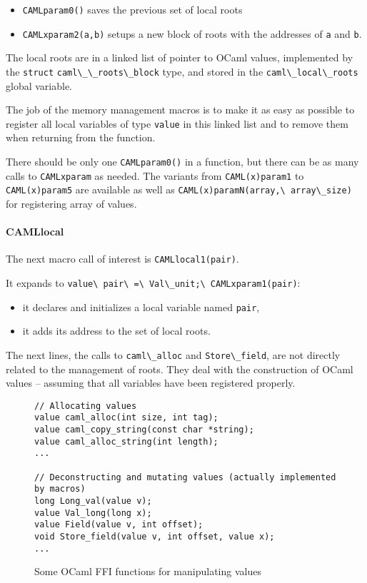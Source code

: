 \documentclass[a4paper]{easychair}
\newcommand{\cpp}[1]{\lstinline[style=C++]{#1}}
\begin{document}
\begin{itemize}
  \item \cpp{CAMLparam0()} saves the previous set of local roots 
  \item \cpp{CAMLxparam2(a,b)} setups a new block of roots with the
      addresses of \cpp{a} and \cpp{b}.
\end{itemize}

The local roots are in a linked list of pointer to OCaml values,
implemented by the \cpp{struct} \cpp{caml\_\_roots\_block} type, and
stored in the \cpp{caml\_local\_roots} global variable.

The job of the memory management macros is to make it as easy as
possible to register all local variables of type \cpp{value} in this
linked list and to remove them when returning from the function.

There should be only one \cpp{CAMLparam0()} in a function, but there
can be as many calls to \cpp{CAMLxparam} as needed. The variants from
\cpp{CAML(x)param1} to \cpp{CAML(x)param5} are available as well as
\cpp{CAML(x)paramN(array,\ array\_size)} for registering array of values.

\paragraph{CAMLlocal} The next macro call of interest is
\cpp{CAMLlocal1(pair)}. 

It expands to \cpp{value\ pair\ =\ Val\_unit;\ CAMLxparam1(pair)}:
%
\begin{itemize}
\item it declares and initializes a local variable named \cpp{pair},
\item it adds its address to the set of local roots.
\end{itemize}

The next lines, the calls to \cpp{caml\_alloc} and
\cpp{Store\_field}, are not directly related to the management of
roots. They deal with the construction of OCaml values -- assuming that
all variables have been registered properly.

\begin{figure}[htbp]
\begin{lstlisting}[style=C++]
// Allocating values
value caml_alloc(int size, int tag);
value caml_copy_string(const char *string);
value caml_alloc_string(int length);
...
    
// Deconstructing and mutating values (actually implemented by macros)
long Long_val(value v);
value Val_long(long x);
value Field(value v, int offset); 
void Store_field(value v, int offset, value x);
...
\end{lstlisting}
  \caption{Some OCaml FFI functions for manipulating values}
  \label{fig:mlvalue}
\end{figure}
\end{document}
